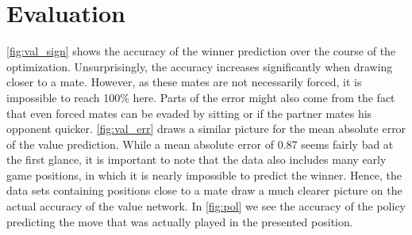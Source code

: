 \section{Evaluation}
\label{sec:evaluation}
\autoref{fig:val_sign} shows the accuracy of the winner prediction over the course of the optimization.
Unsurprisingly, the accuracy increases significantly when drawing closer to a mate.
However, as these mates are not necessarily forced, it is impossible to reach 100\% here.
Parts of the error might also come from the fact that even forced mates can be evaded by sitting or if the partner mates his opponent quicker.
\autoref{fig:val_err} draws a similar picture for the mean absolute error of the value prediction.
While a mean absolute error of 0.87 seems fairly bad at the first glance, it is important to note that the data also includes many early game positions, in which it is nearly impossible to predict the winner.
Hence, the data sets containing positions close to a mate draw a much clearer picture on the actual accuracy of the value network.
In \autoref{fig:pol} we see the accuracy of the policy predicting the move that was actually played in the presented position.

